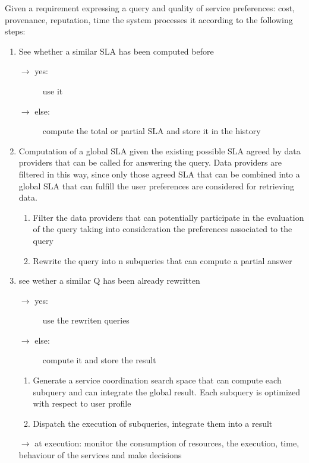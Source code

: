 Given a requirement expressing a query and quality of service preferences: cost, provenance, reputation, time the system processes it according to the following steps:

\begin{enumerate}

\item See whether a similar SLA has been computed before
  \begin{description}
  \item[$\longrightarrow$ yes:] use it
  \item[$\longrightarrow$ else:] compute the total or partial SLA and store it in the history
  \end{description}
  
\item Computation of a global SLA given the existing possible SLA agreed by data providers that can be called for answering the query. Data providers are filtered in this way, since only those agreed SLA that can be combined into a global SLA that can fulfill the user preferences are considered for retrieving data.

  \begin{enumerate}
  \item Filter the data providers that can potentially participate in the evaluation of the query taking into consideration the preferences associated to the query
  \item Rewrite the query into n subqueries that can compute a partial answer
  \end{enumerate}

\item see wether a similar Q has been already rewritten
  \begin{description}
  \item[$\longrightarrow$ yes:] use the rewriten queries
  \item[$\longrightarrow$ else:] compute it and store the result
  \end{description}
  \begin{enumerate}
  \item Generate a service coordination search space that can compute each subquery and can integrate the global result. 
Each subquery is optimized with respect to user profile
  \item Dispatch the execution of subqueries, integrate them into a result
  \end{enumerate}

\item[$\longrightarrow$] at execution: monitor the consumption of resources, the execution, time, behaviour of the services and make decisions
\end{enumerate}